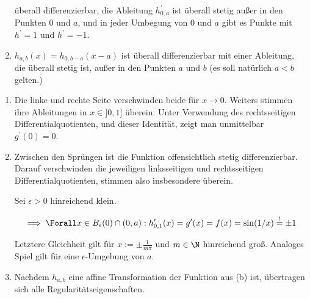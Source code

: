 \begin{exercise}
\begin{enumerate}[label = (\alph*)]
    überall differenzierbar, die Ableitung $h_{0, a}^\prime$ ist überall stetig außer in den Punkten $0$ und $a$, und in jeder Umbegung von $0$ und $a$ gibt es Punkte mit $h^\prime = 1$ und $h^\prime = -1$.

    \item $h_{a, b}(x) = h_{0, b - a}(x - a)$ ist überall differenzierbar mit einer Ableitung, die überall stetig ist, außer in den Punkten $a$ und $b$ (es soll natürlich $a < b$ gelten.)

\end{enumerate}

\end{exercise}


\begin{solution}

\phantom{}

\begin{enumerate}[label = (\alph*)]

    \item Die linke und rechte Seite verschwinden beide für $x \to 0$.
    Weiters stimmen ihre Ableitungen in $x \in ]0, 1]$ überein.
    Unter Verwendung des rechtsseitigen Differentialquotienten, und dieser Identität, zeigt man unmittelbar $g^\prime(0) = 0$.

    \item Zwischen den Sprüngen ist die Funktion offensichtlich stetig differenzierbar.
    Darauf verschwinden die jeweiligen linksseitigen und rechtsseitigen Differentialquotienten, stimmen also insbesondere überein.

    Sei $\epsilon > 0$ hinreichend klein.

    \begin{align*}
        \implies
        \Forall x \in B_\epsilon(0) \cap (0, a):
            h_{0, 1}^\prime(x)
            =
            g^\prime(x)
            =
            f(x)
            =
            \sin(1 / x)
            \stackrel{!}{=}
            \pm 1
    \end{align*}

    Letztere Gleichheit gilt für $x := \pm \frac{1}{m \pi}$ und $m \in \N$ hinreichend groß.
    Analoges Spiel gilt für eine $\epsilon$-Umgebung von $a$.

    \item Nachdem $h_{a, b}$ eine affine Transformation der Funktion aus (b) ist, übertragen sich alle Regularitätseigenschaften.

\end{enumerate}

\end{solution}

